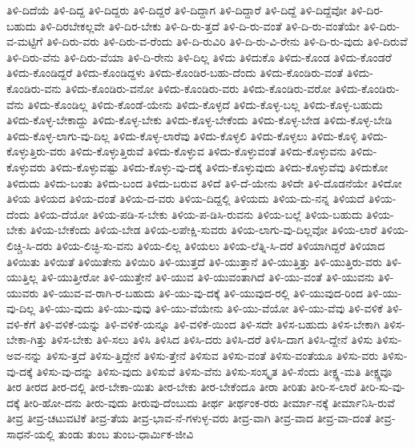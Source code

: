 {ತಿಳಿ-ದಿದೆಯೆ
ತಿಳಿ-ದಿದ್ದ
ತಿಳಿ-ದಿದ್ದರು
ತಿಳಿ-ದಿದ್ದರೆ
ತಿಳಿ-ದಿದ್ದಾಗ
ತಿಳಿ-ದಿದ್ದಾರೆ
ತಿಳಿ-ದಿದ್ದೆ
ತಿಳಿ-ದಿದ್ದೆವೋ
ತಿಳಿ-ದಿರ-ಬಹುದು
ತಿಳಿ-ದಿರಬೇಕಲ್ಲವೇ
ತಿಳಿ-ದಿರ-ಬೇಕು
ತಿಳಿ-ದಿ-ರು-ತ್ತದೆ
ತಿಳಿ-ದಿ-ರು-ವಂತೆ
ತಿಳಿ-ದಿ-ರು-ವಂತೆಯೇ
ತಿಳಿ-ದಿರು-ವ-ಮಟ್ಟಿಗೆ
ತಿಳಿ-ದಿರು-ವರು
ತಿಳಿ-ದಿರು-ವ-ರೆಂದು
ತಿಳಿ-ದಿ-ರುವಿರಿ
ತಿಳಿ-ದಿ-ರು-ವಿ-ರೇನು
ತಿಳಿ-ದಿ-ರು-ವುದು
ತಿಳಿ-ದಿರುವೆ
ತಿಳಿ-ದಿರು-ವೆನು
ತಿಳಿ-ದಿರು-ವೆಯಾ
ತಿಳಿ-ದಿ-ರೇನು
ತಿಳಿ-ದಿಲ್ಲ
ತಿಳಿದು
ತಿಳಿದುಕೊ
ತಿಳಿದು-ಕೊಂಡ
ತಿಳಿದು-ಕೊಂಡರೆ
ತಿಳಿದು-ಕೊಂಡಿದ್ದರೆ
ತಿಳಿದು-ಕೊಂಡಿದ್ದಳು
ತಿಳಿದು-ಕೊಂಡಿರ-ಬಹು-ದೆಂದು
ತಿಳಿದು-ಕೊಂಡಿರು-ವಂತೆ
ತಿಳಿದು-ಕೊಂಡಿರು-ವನು
ತಿಳಿದು-ಕೊಂಡಿರು-ವನೋ
ತಿಳಿದು-ಕೊಂಡಿರು-ವರು
ತಿಳಿದು-ಕೊಂಡಿರು-ವರೋ
ತಿಳಿದು-ಕೊಂಡಿರು-ವೆನು
ತಿಳಿದು-ಕೊಂಡಿಲ್ಲ
ತಿಳಿದು-ಕೊಂಡೆ-ಯೇನು
ತಿಳಿದು-ಕೊಳ್ಳದೆ
ತಿಳಿದು-ಕೊಳ್ಳ-ಬಲ್ಲ
ತಿಳಿದು-ಕೊಳ್ಳ-ಬಹುದು
ತಿಳಿದು-ಕೊಳ್ಳ-ಬೇಕಾದ್ದು
ತಿಳಿದು-ಕೊಳ್ಳ-ಬೇಕು
ತಿಳಿದು-ಕೊಳ್ಳ-ಬೇಕೆಂದು
ತಿಳಿದು-ಕೊಳ್ಳ-ಬೇಡ
ತಿಳಿದು-ಕೊಳ್ಳ-ಬೇಡಿ
ತಿಳಿದು-ಕೊಳ್ಳ-ಲಾಗು-ವು-ದಿಲ್ಲ
ತಿಳಿದು-ಕೊಳ್ಳ-ಲಾರೆವು
ತಿಳಿದು-ಕೊಳ್ಳಲಿ
ತಿಳಿದು-ಕೊಳ್ಳಲು
ತಿಳಿದು-ಕೊಳ್ಳಿ
ತಿಳಿದು-ಕೊಳ್ಳುತ್ತಿರು-ವರು
ತಿಳಿದು-ಕೊಳ್ಳುತ್ತಿರುವೆ
ತಿಳಿದು-ಕೊಳ್ಳುವ
ತಿಳಿದು-ಕೊಳ್ಳುವಂತೆ
ತಿಳಿದು-ಕೊಳ್ಳುವನು
ತಿಳಿದು-ಕೊಳ್ಳುವರು
ತಿಳಿದು-ಕೊಳ್ಳುವಷ್ಟು
ತಿಳಿದು-ಕೊಳ್ಳು-ವು-ದಕ್ಕೆ
ತಿಳಿದು-ಕೊಳ್ಳುವುದು
ತಿಳಿದು-ಕೊಳ್ಳುವೆವು
ತಿಳಿದುಕೋ
ತಿಳಿದುದು
ತಿಳಿದು-ಬಂತು
ತಿಳಿದು-ಬಂದ
ತಿಳಿದು-ಬರುವ
ತಿಳಿದೆ
ತಿಳಿ-ದೆ-ಯೇನು
ತಿಳಿದೇ
ತಿಳಿ-ದೊಡನೆಯೇ
ತಿಳಿದೋ
ತಿಳಿಯ
ತಿಳಿಯದ
ತಿಳಿಯ-ದಂತೆ
ತಿಳಿಯ-ದ-ವರು
ತಿಳಿಯ-ದಿದ್ದಲ್ಲಿ
ತಿಳಿಯದು
ತಿಳಿಯ-ದು-ನನ್ನ
ತಿಳಿಯದೆ
ತಿಳಿಯ-ದೆಂದು
ತಿಳಿಯ-ದೆಯೋ
ತಿಳಿಯ-ಪಡಿ-ಸ-ಬೇಕು
ತಿಳಿಯ-ಪ-ಡಿಸಿ-ರುವನು
ತಿಳಿಯ-ಬಲ್ಲೆ
ತಿಳಿಯ-ಬಹುದು
ತಿಳಿಯ-ಬೇಕು
ತಿಳಿಯ-ಬೇಕೆಂದು
ತಿಳಿಯ-ಬೇಡ
ತಿಳಿಯ-ಲಪೇಕ್ಷಿ-ಸುವರು
ತಿಳಿಯ-ಲಾಗು-ವು-ದಿಲ್ಲವೋ
ತಿಳಿಯ-ಲಾರೆ
ತಿಳಿಯ-ಲಿಚ್ಚಿ-ಸಿ-ದರು
ತಿಳಿಯ-ಲಿಚ್ಛಿ-ಸು-ವನು
ತಿಳಿಯ-ಲಿಲ್ಲ
ತಿಳಿಯಲು
ತಿಳಿಯ-ಲೆತ್ನಿ-ಸಿ-ದರೆ
ತಿಳಿಯಾಗಿದ್ದರೆ
ತಿಳಿಯಾದ
ತಿಳಿಯಿತು
ತಿಳಿಯಿತೆ
ತಿಳಿಯಿತೇನು
ತಿಳಿಯಿರಿ
ತಿಳಿ-ಯುತ್ತದೆ
ತಿಳಿ-ಯುತ್ತಾನೆ
ತಿಳಿ-ಯುತ್ತಿತ್ತು
ತಿಳಿ-ಯುತ್ತಿರು-ವರು
ತಿಳಿ-ಯುತ್ತಿಲ್ಲ
ತಿಳಿ-ಯುತ್ತೀರೋ
ತಿಳಿ-ಯುತ್ತೇನೆ
ತಿಳಿ-ಯುವ
ತಿಳಿ-ಯುವಂತಾಗಿದೆ
ತಿಳಿ-ಯು-ವಂತೆ
ತಿಳಿ-ಯುವನು
ತಿಳಿ-ಯುವರು
ತಿಳಿ-ಯುವ-ವ-ರಾಗಿ-ರ-ಬಹುದು
ತಿಳಿ-ಯು-ವು-ದಕ್ಕೆ
ತಿಳಿ-ಯುವುದ-ರಲ್ಲಿ
ತಿಳಿ-ಯುವುದ-ರಿಂದ
ತಿಳಿ-ಯು-ವು-ದಿಲ್ಲ
ತಿಳಿ-ಯು-ವುದು
ತಿಳಿ-ಯು-ವುವು
ತಿಳಿ-ಯು-ವೆಯೇನು
ತಿಳಿ-ಯು-ವೆಯೋ
ತಿಳಿ-ಯು-ವೆವು
ತಿಳಿ-ವಳಿಕೆ
ತಿಳಿ-ವಳಿ-ಕೆಗೆ
ತಿಳಿ-ವಳಿಕೆ-ಯನ್ನು
ತಿಳಿ-ವಳಿಕೆ-ಯನ್ನೂ
ತಿಳಿ-ವಳಿಕೆ-ಯಿಂದ
ತಿಳಿ-ಸದೇ
ತಿಳಿಸ-ಬಹುದು
ತಿಳಿಸ-ಬೇಕಾಗಿ
ತಿಳಿಸ-ಬೇಕಾ-ಗಿತ್ತು
ತಿಳಿಸ-ಬೇಕು
ತಿಳಿ-ಸಲು
ತಿಳಿಸಿ
ತಿಳಿಸಿದ
ತಿಳಿಸಿ-ದರು
ತಿಳಿಸಿ-ದರೆ
ತಿಳಿಸಿ-ದಾಗ
ತಿಳಿಸಿ-ದ್ದೇನೆ
ತಿಳಿಸು
ತಿಳಿಸು-ಅವ-ನನ್ನು
ತಿಳಿಸು-ತ್ತದೆ
ತಿಳಿಸು-ತ್ತಿದ್ದೇನೆ
ತಿಳಿಸು-ತ್ತೇನೆ
ತಿಳಿಸುವ
ತಿಳಿಸು-ವಂತೆ
ತಿಳಿಸು-ವಂತೆಯೂ
ತಿಳಿಸು-ವರು
ತಿಳಿಸು-ವು-ದಕ್ಕೆ
ತಿಳಿಸು-ವು-ದನ್ನು
ತಿಳಿಸು-ವುದು
ತಿಳಿಸುವೆ
ತಿಳಿಸು-ವೆನು
ತಿಳಿಸು-ಸಂಸ್ಕೃತ
ತಿಳಿ-ಸೆಂದು
ತೀಕ್ಷ್ಣ-ಮತಿ
ತೀಕ್ಷ್ಣವೂ
ತೀರ
ತೀರದ
ತೀರ-ದಲ್ಲಿ
ತೀರ-ಬೇಕಾ-ಯಿತು
ತೀರ-ಬೇಕು
ತೀರ-ಬೇಕೆಂದೂ
ತೀರಾ
ತೀರಿತು
ತೀರಿ-ಸ-ಲಾರೆ
ತೀರಿ-ಸು-ವು-ದಕ್ಕೆ
ತೀರಿ-ಹೋ-ದನು
ತೀರು-ವುದು
ತೀರುವು-ದೆಂಬುದು
ತೀರ್ಥ
ತೀರ್ಥಂಕ-ರರು
ತೀರ್ಮಾ-ನಕ್ಕೆ
ತೀರ್ಮಾನಿಸಿ-ರುವೆ
ತೀವ್ರ
ತೀವ್ರ-ಚಟುವಟಿಕೆ
ತೀವ್ರ-ತೆಯ
ತೀವ್ರ-ಭಾವ-ನೆ-ಗಳುಳ್ಳ-ವರು
ತೀವ್ರ-ವಾಗಿ
ತೀವ್ರ-ವಾದ
ತೀವ್ರ-ವಾ-ದಂತೆ
ತೀವ್ರ-ಸಾಧನೆ-ಯಲ್ಲಿ
ತುಂಡು
ತುಂಬ
ತುಂಬ-ಧಾರ್ಮಿಕ-ಜೀವಿ
}

